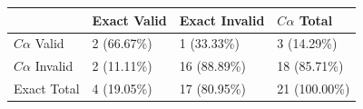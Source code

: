 \begin{tabular}{llll}
\toprule
 & Exact Valid & Exact Invalid & $C\alpha$ Total \\
\midrule
$C\alpha$ Valid & 2 (66.67\%) & 1 (33.33\%) & 3 (14.29\%) \\
$C\alpha$ Invalid & 2 (11.11\%) & 16 (88.89\%) & 18 (85.71\%) \\
Exact Total & 4 (19.05\%) & 17 (80.95\%) & 21 (100.00\%) \\
\bottomrule
\end{tabular}
